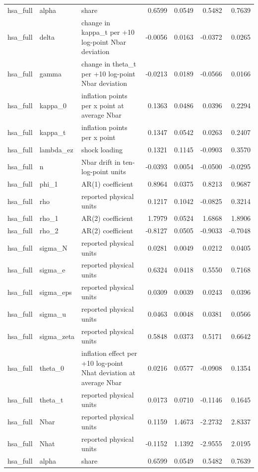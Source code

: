 \begin{tabular}{lllrrrr}
hsa\_full & alpha & share & 0.6599 & 0.0549 & 0.5482 & 0.7639 \\
hsa\_full & delta & change in kappa\_t per +10 log-point Nbar deviation & -0.0056 & 0.0163 & -0.0372 & 0.0265 \\
hsa\_full & gamma & change in theta\_t per +10 log-point Nbar deviation & -0.0213 & 0.0189 & -0.0566 & 0.0166 \\
hsa\_full & kappa\_0 & inflation points per x point at average Nbar & 0.1363 & 0.0486 & 0.0396 & 0.2294 \\
hsa\_full & kappa\_t & inflation points per x point & 0.1347 & 0.0542 & 0.0263 & 0.2407 \\
hsa\_full & lambda\_ez & shock loading & 0.1321 & 0.1145 & -0.0903 & 0.3570 \\
hsa\_full & n & Nbar drift in ten-log-point units & -0.0393 & 0.0054 & -0.0500 & -0.0295 \\
hsa\_full & phi\_1 & AR(1) coefficient & 0.8964 & 0.0375 & 0.8213 & 0.9687 \\
hsa\_full & rho & reported physical units & 0.1217 & 0.1042 & -0.0825 & 0.3214 \\
hsa\_full & rho\_1 & AR(2) coefficient & 1.7979 & 0.0524 & 1.6868 & 1.8906 \\
hsa\_full & rho\_2 & AR(2) coefficient & -0.8127 & 0.0505 & -0.9033 & -0.7048 \\
hsa\_full & sigma\_N & reported physical units & 0.0281 & 0.0049 & 0.0212 & 0.0405 \\
hsa\_full & sigma\_e & reported physical units & 0.6324 & 0.0418 & 0.5550 & 0.7168 \\
hsa\_full & sigma\_eps & reported physical units & 0.0309 & 0.0039 & 0.0243 & 0.0396 \\
hsa\_full & sigma\_u & reported physical units & 0.0463 & 0.0048 & 0.0381 & 0.0566 \\
hsa\_full & sigma\_zeta & reported physical units & 0.5848 & 0.0373 & 0.5171 & 0.6642 \\
hsa\_full & theta\_0 & inflation effect per +10 log-point Nhat deviation at average Nbar & 0.0216 & 0.0577 & -0.0908 & 0.1354 \\
hsa\_full & theta\_t & reported physical units & 0.0173 & 0.0710 & -0.1146 & 0.1645 \\
hsa\_full & Nbar & reported physical units & 0.1159 & 1.4673 & -2.2732 & 2.8337 \\
hsa\_full & Nhat & reported physical units & -0.1152 & 1.1392 & -2.9555 & 2.0195 \\
hsa\_full & alpha & share & 0.6599 & 0.0549 & 0.5482 & 0.7639 \\

\end{tabular}
